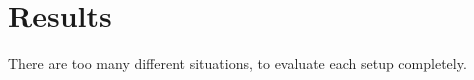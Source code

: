 \chapter{Results}
\label{ch:results}


There are too many different situations, to evaluate each setup completely.
